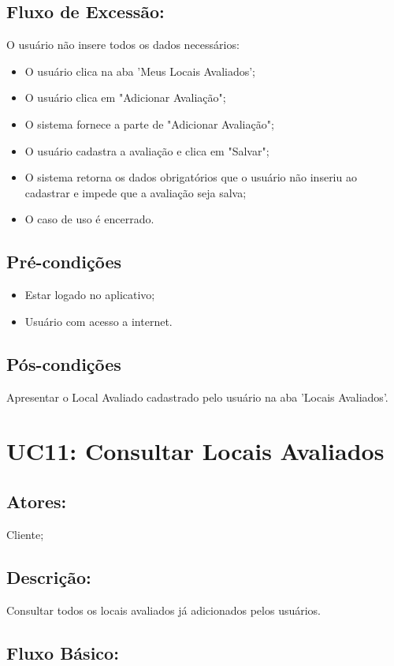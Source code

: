 \subsection{Fluxo de Excessão:}
O usuário não insere todos os dados necessários: 
\begin{itemize}
    \item O usuário clica na aba 'Meus Locais Avaliados';
    \item O usuário clica em "Adicionar Avaliação";
    \item O sistema fornece a parte de "Adicionar Avaliação";
    \item O usuário cadastra a avaliação e clica em "Salvar";
    \item O sistema retorna os dados obrigatórios que o usuário não inseriu ao cadastrar e impede que a avaliação seja salva;
    \item O caso de uso é encerrado. 
\end{itemize}
\subsection{Pré-condições}
\begin{itemize}
    \item Estar logado no aplicativo;
    \item Usuário com acesso a internet. 
\end{itemize}
\subsection{Pós-condições}
Apresentar o Local Avaliado cadastrado pelo usuário na aba 'Locais Avaliados'. 
\section{UC11: Consultar Locais Avaliados}

\subsection{Atores:}
Cliente;
\subsection{Descrição:}
Consultar todos os locais avaliados já adicionados pelos usuários. 
\subsection{Fluxo Básico:}

